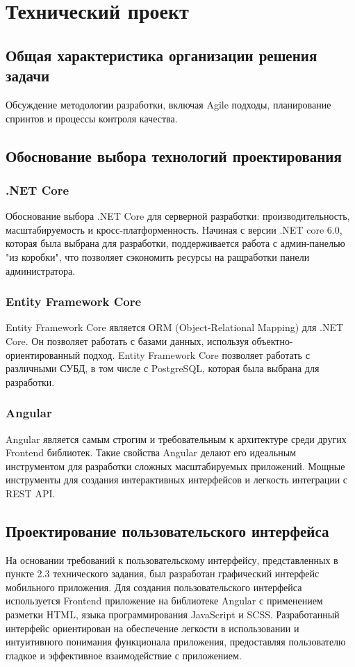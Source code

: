 \section{Технический проект}

\subsection{Общая характеристика организации решения задачи}
Обсуждение методологии разработки, включая Agile подходы, планирование спринтов и процессы контроля качества.

\subsection{Обоснование выбора технологий проектирования}
\subsubsection{.NET Core}
Обоснование выбора .NET Core для серверной разработки: производительность, масштабируемость и кросс-платформенность.
Начиная с версии .NET core 6.0, которая была выбрана для разработки, поддерживается работа с админ-панелью "из коробки", что позволяет сэкономить ресурсы на ращработки панели администратора.
\subsubsection{Entity Framework Core}
Entity Framework Core является ORM (Object-Relational Mapping) для .NET Core. Он позволяет работать с базами данных, используя объектно-ориентированный подход. Entity Framework Core позволяет работать с различными СУБД, в том числе с PostgreSQL, которая была выбрана для разработки.
\subsubsection{Angular}
Angular является самым строгим и требовательным к архитектуре среди других Frontend библиотек. Такие свойства Angular делают его идеальным инструментом для разработки сложных масштабируемых приложений. Мощные инструменты для создания интерактивных интерфейсов и легкость интеграции с REST API.

\subsection{Проектирование пользовательского интерфейса}

На основании требований к пользовательскому интерфейсу, представленных в пункте 2.3 технического задания, был разработан графический интерфейс мобильного приложения. Для создания пользовательского интерфейса используется Frontend приложение на библиотеке Angular с применением разметки HTML, языка программирования JavaScript и SCSS.
Разработанный интерфейс ориентирован на обеспечение легкости в использовании и интуитивного понимания функционала приложения, предоставляя пользователю гладкое и эффективное взаимодействие с приложением.

